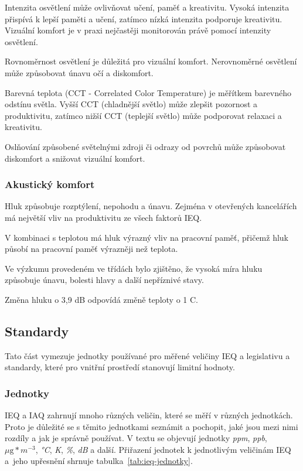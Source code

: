 Intenzita osvětlení může ovlivňovat učení, paměť a kreativitu. Vysoká intenzita přispívá k lepší paměti a učení, zatímco nízká intenzita podporuje kreativitu. Vizuální komfort je v praxi nejčastěji monitorován právě pomocí intenzity osvětlení. \parencite{dengImpactIndoorAir2024}

Rovnoměrnost osvětlení je důležitá pro vizuální komfort. Nerovnoměrné osvětlení může způsobovat únavu očí a diskomfort. \parencite{dengImpactIndoorAir2024}

Barevná teplota (CCT - Correlated Color Temperature) je měřítkem barevného odstínu světla. Vyšší CCT (chladnější světlo) může zlepšit pozornost a produktivitu, zatímco nižší CCT (teplejší světlo) může podporovat relaxaci a kreativitu. \parencite{dengImpactIndoorAir2024}

Oslňování způsobené světelnými zdroji či odrazy od povrchů může způsobovat diskomfort a snižovat vizuální komfort. \parencite{dengImpactIndoorAir2024}

\FloatBarrier
\subsubsection{Akustický komfort}
Hluk způsobuje rozptýlení, nepohodu a únavu. Zejména v otevřených kancelářích má největší vliv na produktivitu ze všech faktorů IEQ. \parencite{dengImpactIndoorAir2024}

V kombinaci s teplotou má hluk výrazný vliv na pracovní paměť, přičemž hluk působí na pracovní paměť výrazněji než teplota. \parencite{dengImpactIndoorAir2024} 

Ve výzkumu provedeném ve třídách bylo zjištěno, že vysoká míra hluku způsobuje únavu, bolesti hlavy a další nepříznivé stavy. \parencite{dengImpactIndoorAir2024}

Změna hluku o 3,9 dB odpovídá změně teploty o 1 \textdegree C. \parencite{dengImpactIndoorAir2024}


\FloatBarrier
\subsection{Standardy}

Tato část vymezuje jednotky používané pro měřené veličiny IEQ a legislativu a standardy, které pro vnitřní prostředí stanovují limitní hodnoty.

\FloatBarrier
\subsubsection{Jednotky}
IEQ a IAQ zahrnují mnoho různých veličin, které se měří v různých jednotkách. Proto je důležité se s těmito jednotkami seznámit a pochopit, jaké jsou mezi nimi rozdíly a jak je správně používat. V textu se objevují jednotky \textit{ppm}, \textit{ppb}, \textit{$\mu\text{g}*m^{-3}$}, \textit{°C}, \textit{K}, \textit{\%}, \textit{dB} a další. Přiřazení jednotek k jednotlivým veličinám IEQ a~jeho upřesnění shrnuje tabulka~\ref{tab:ieq-jednotky}.\parencite{dengImpactIndoorAir2024}

